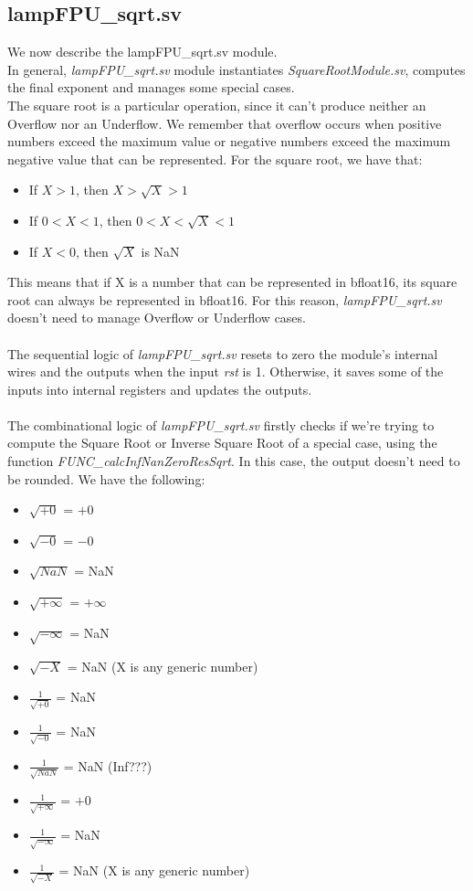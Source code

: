 \subsection{lampFPU\_sqrt.sv}
We now describe the lampFPU\_sqrt.sv module.\\
In general, \emph{lampFPU\_sqrt.sv} module instantiates \emph{SquareRootModule.sv}, computes the final exponent and manages some special cases. \\ 
The square root is a particular operation, since it can't produce neither an Overflow nor an Underflow. We remember that overflow occurs when positive numbers exceed the maximum value or negative numbers exceed the maximum negative value that can be represented. For the square root, we have that:
\begin{itemize}
\item If $X > 1$, then $X > \sqrt{X} > 1$ 
\item If $0 < X < 1$, then $0 < X < \sqrt{X} < 1$
\item If $X < 0$, then $\sqrt{X}$ is NaN
\end{itemize}
This means that if X is a number that can be represented in bfloat16, its square root can always be represented in bfloat16. For this reason, \emph{lampFPU\_sqrt.sv} doesn't need to manage Overflow or Underflow cases.\\ \\
The sequential logic of  \emph{lampFPU\_sqrt.sv} resets to zero the module's internal wires and the outputs when the input \emph{rst} is 1. Otherwise, it saves some of the inputs into internal registers and updates the outputs.\\\\
The combinational logic of \emph{lampFPU\_sqrt.sv} firstly checks if we're trying to compute the Square Root or Inverse Square Root of a special case, using the function \emph{FUNC\_calcInfNanZeroResSqrt}. In this case, the output doesn't need to be rounded. We have the following:
\begin{itemize}
\item $\sqrt{+0}$ = $+0$ 
\item $\sqrt{-0}$ = $-0$
\item $\sqrt{NaN}$ = NaN
\item $\sqrt{+ \infty}$  =  $+\infty$
\item $\sqrt{- \infty}$ =  NaN
\item $\sqrt{- X}$ = NaN  (X is any generic number) 
\item $\frac{1}{\sqrt{+0}}$ = NaN
\item $\frac{1}{\sqrt{-0}}$ = NaN
\item $\frac{1}{\sqrt{NaN}}$ = NaN (Inf???)
\item $\frac{1}{\sqrt{+\infty}}$ = $+0$
\item $\frac{1}{\sqrt{-\infty}}$ = NaN
\item $\frac{1}{\sqrt{-X}}$ = NaN  (X is any generic number) 
\end{itemize}

